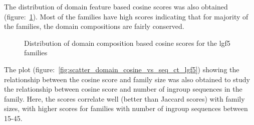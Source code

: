 \documentclass{article}
\begin{document}
		The distribution of domain feature based cosine scores was also obtained (figure:~\ref{fig:hist_domain_cosine_scores_lgf5}). Most of the families have high scores indicating that for majority of the families, the domain compositions are fairly conserved. 
		
		\begin{figure}
			\caption{Distribution of domain composition based cosine scores for the lgf5 families}
			\label{fig:hist_domain_cosine_scores_lgf5}
		\end{figure}
		
		The plot (figure:~\ref{fig:scatter_domain_cosine_vs_seq_ct_lgf5}) showing the relationship between the cosine score and family size was also obtained to study the relationship between cosine score and number of ingroup sequences in the family. Here, the scores correlate well (better than Jaccard scores) with family sizes, with higher scores for families with number of ingroup sequences between 15-45.
		
\end{document}
